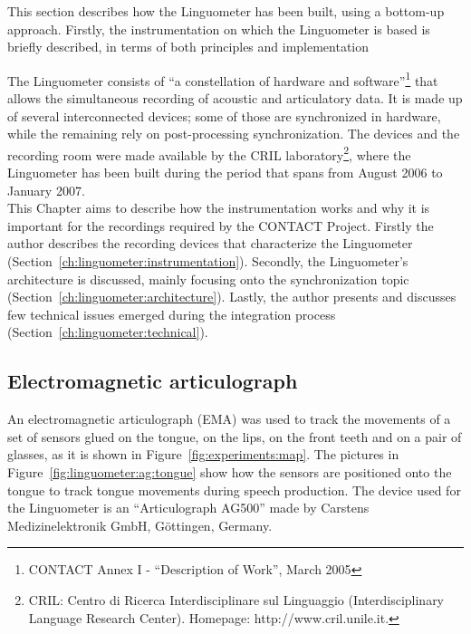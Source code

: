 This section describes how the Linguometer has been built, using a bottom-up
approach. 
Firstly, the instrumentation on which the Linguometer is based is briefly
described, in terms of both principles and implementation

The Linguometer consists of ``a constellation of hardware and
software''\footnote{CONTACT Annex I - ``Description of Work'',
March 2005} that allows the simultaneous recording of acoustic and articulatory
data.
It is made up of several interconnected devices; some of those are 
synchronized in hardware, while the remaining rely on post-processing
synchronization.
The devices and the recording room were made available by the CRIL 
laboratory\footnote{CRIL: Centro di Ricerca Interdisciplinare sul Linguaggio 
(Interdisciplinary Language Research Center).
Homepage: http://www.cril.unile.it.},
where the Linguometer has been built during the period that spans
from August 2006 to January 2007.\\
This Chapter aims to describe how the instrumentation works and why it is
important for the recordings required by the CONTACT Project.
Firstly the author describes the recording devices that characterize the
Linguometer (Section~\ref{ch:linguometer:instrumentation}).
Secondly, the Linguometer's architecture is discussed, mainly focusing onto the
synchronization topic (Section~\ref{ch:linguometer:architecture}).
Lastly, the author presents and discusses few technical issues emerged during
the integration process (Section~\ref{ch:linguometer:technical}).
\subsection{Electromagnetic articulograph}
\label{sec:linguometer:instrumentation:ag}
An electromagnetic articulograph (EMA) was used to track the movements of a set
of sensors glued on the tongue, on the lips, on the front teeth and on 
a pair of glasses, as it is shown in Figure~\ref{fig:experiments:map}.
The pictures in Figure~\ref{fig:linguometer:ag:tongue} show how the sensors are
positioned onto the tongue to track tongue movements during speech production.
The device used for the Linguometer is an ``Articulograph AG500'' made by
Carstens Medizinelektronik GmbH, G\"ottingen, Germany.

